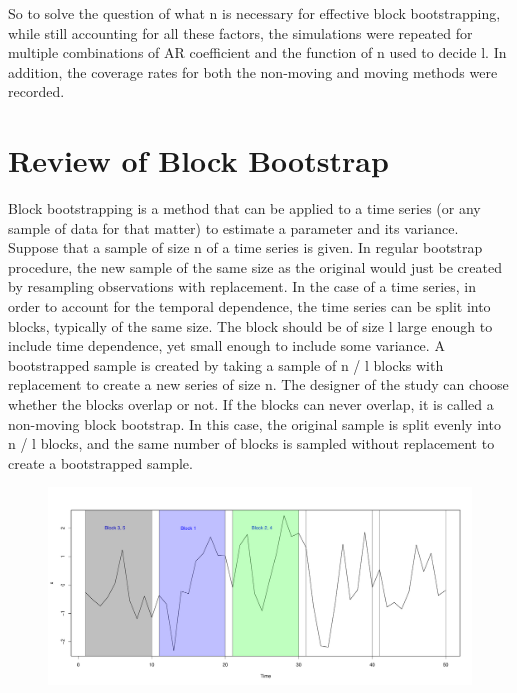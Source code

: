 \documentclass[12pt, letterpaper, titlepage]{article}
\begin{document}
So to solve the question of what n is necessary for effective block bootstrapping,
while still accounting for all these factors, the simulations were repeated for
multiple combinations of AR coefficient and the function of n used to decide l. In 
addition, the coverage rates
for both the non-moving and moving methods were recorded.

\section{Review of Block Bootstrap}
\label{sec:blkbootreview}

Block bootstrapping is a method that can be applied to a time series (or any sample of data for that matter) to estimate a parameter and its variance. Suppose that a sample of size n of a time series is given. In regular bootstrap procedure, the new sample of the same size as the original would just be created by resampling observations with replacement. In the case of a time series, in order to account for the temporal dependence, the time series can be split into blocks, typically of the same size. The block should be of size l large enough to include time dependence, yet small enough to include some variance. A bootstrapped sample is created by taking a sample of n / l blocks with replacement to create a new series of size n. The designer of the study can choose whether the blocks overlap or not. If the blocks can never overlap, it is called a non-moving block bootstrap. In this case, the original sample is split evenly into n / l blocks, and the same number of blocks is sampled without replacement to create a bootstrapped sample.

\begin{figure}[h]
  \centering
  \includegraphics[width=\textwidth]{orig_ts}
  \caption{}
  \label{fig:orig_ts}
\end{figure}
\end{document}
